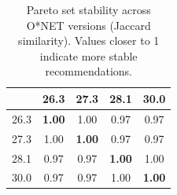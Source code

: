 \begin{table}[t]
\centering
\small
\caption{Pareto set stability across O*NET versions (Jaccard similarity). Values closer to 1 indicate more stable recommendations.}
\label{tab:jaccard_matrix}
\begin{tabular}{@{}lcccc@{}}
\toprule
 & 26.3 & 27.3 & 28.1 & 30.0 \\
\midrule
26.3 & \textbf{1.00} & 1.00 & 0.97 & 0.97 \\
27.3 & 1.00 & \textbf{1.00} & 0.97 & 0.97 \\
28.1 & 0.97 & 0.97 & \textbf{1.00} & 1.00 \\
30.0 & 0.97 & 0.97 & 1.00 & \textbf{1.00} \\
\bottomrule
\end{tabular}
\end{table}